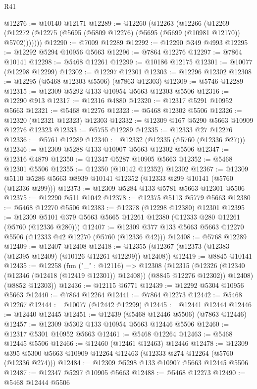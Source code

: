 \begin{lexlean}{R41}
\begin{coremodule}
@12276 := @10140 @12171
@12289 := @12260
    (@12263
      (@12266
        (@12269 (@12272 (@12275 (@5695 (@5809 @12276) (@5695 (@5699 (@10981 @12170)) @5702)))))))
@12290 := @7009 @12289
@12292 := @12290 @349 @4993
@12295 := @12292 @5294 @10956 @5663
@12296 := @7864 @12276
@12297 := @7864 @10141
@12298 := @5468 @12261
@12299 := @10186 @12175
@12301 := @10077 (@12298 @12299)
@12302 := @12297 @12301
@12303 := @12296 @12302
@12308 := @12295 (@5468 @12303 @5506) (@7863 @12303)
@12309 := @5746 @12289
@12315 := @12309 @5292 @133 @10954 @5663 @12303 @5506
@12316 := @12290 @913
@12317 := @12316 @4880
@12320 := @12317 @5291 @10952 @5663
@12321 := @5468 @12276
@12323 := @5468 @12302 @5506
@12326 := @12320 (@12321 @12323) @12303
@12332 := @12309 @167 @5290 @5663 @10909 @12276 @12323
@12333 := @5755 @12289
@12335 := @12333 @27 @12276
@12336 := @5761 @12289
@12340 := @12332 (@12335 (@5760 (@12336 @27)))
@12346 := @12309 @5288 @133 @10907 @5663 @12302 @5506
@12347 := @12316 @4879
@12350 := @12347 @5287 @10905 @5663
@12352 := @5468 @12301 @5506
@12355 := @12350 (@10142 @12352) @12302
@12367 := @12309 @5110 @5286 @5663 @8939 @10141 @12352 (@12333 @299 @10141 (@5760 (@12336 @299)))
@12373 := @12309 @5284 @133 @5781 @5663 @12301 @5506
@12375 := @12290 @511 @1042
@12378 := @12375 @5113 @5779 @5663
@12380 := @5468 @12270 @5506
@12383 := @12378 (@12298 @12380) @12301
@12395 := @12309 @5101 @379 @5663 @5665 @12261 @12380 (@12333 @280 @12261 (@5760 (@12336 @280)))
@12407 := @12309 @377 @133 @5663 @5663 @12270 @5506 (@12333 @42 @12270 (@5760 (@12336 @42)))
@12408 := @5768 @12289
@12409 := @12407 @12408
@12418 := @12355 (@12367 (@12373 (@12383 (@12395 @12409) (@10126 @12261 @12299)) @12408))
@12419 := @8845 @10141
@12435 := @12258
    (fun ("_" : @12116) =>
    @12308
      (@12315
        (@12326 (@12340 (@12346 (@12418 (@12419 @12301)) @12408)) (@8845 @12276 @12302))
        @12408)
      (@8852 @12303))
@12436 := @12115 @6771
@12439 := @12292 @5304 @10956 @5663
@12440 := @7864 @12264
@12441 := @7864 @12273
@12442 := @5468 @12267
@12444 := @10077 (@12442 @12299)
@12445 := @12441 @12444
@12446 := @12440 @12445
@12451 := @12439 (@5468 @12446 @5506) (@7863 @12446)
@12457 := @12309 @5302 @133 @10954 @5663 @12446 @5506
@12460 := @12317 @5301 @10952 @5663
@12461 := @5468 @12264
@12463 := @5468 @12445 @5506
@12466 := @12460 (@12461 @12463) @12446
@12478 := @12309 @395 @5300 @5663 @10909 @12264 @12463 (@12333 @274 @12264 (@5760 (@12336 @274)))
@12484 := @12309 @5298 @133 @10907 @5663 @12445 @5506
@12487 := @12347 @5297 @10905 @5663
@12488 := @5468 @12273
@12490 := @5468 @12444 @5506

\end{coremodule}
\end{lexlean}

